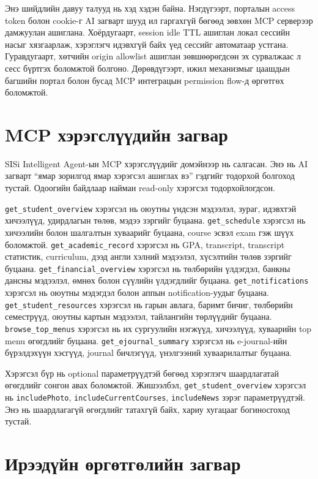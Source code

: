 Энэ шийдлийн давуу талууд нь хэд хэдэн байна. Нэгдүгээрт, порталын access token болон cookie-г AI загварт шууд ил гаргахгүй бөгөөд зөвхөн MCP серверээр дамжуулан ашиглана. Хоёрдугаарт, session idle TTL ашиглан локал сессийн насыг хязгаарлаж, хэрэглэгч идэвхгүй байх үед сессийг автоматаар устгана. Гуравдугаарт, хөтчийн origin allowlist ашиглан зөвшөөрөгдсөн эх сурвалжаас л сесс бүртгэх боломжтой болгоно. Дөрөвдүгээрт, ижил механизмыг цаашдын багшийн портал болон бусад MCP интеграцын permission flow-д өргөтгөх боломжтой.

\section{MCP хэрэгслүүдийн загвар}

SISi Intelligent Agent-ын MCP хэрэгслүүдийг домэйнээр нь салгасан. Энэ нь AI загварт ``ямар зорилгод ямар хэрэгсэл ашиглах вэ'' гэдгийг тодорхой болгоход тустай. Одоогийн байдлаар найман read-only хэрэгсэл тодорхойлогдсон.

\texttt{get\_student\_overview} хэрэгсэл нь оюутны үндсэн мэдээлэл, зураг, идэвхтэй хичээлүүд, удирдлагын төлөв, мэдээ зэргийг буцаана. \texttt{get\_schedule} хэрэгсэл нь хичээлийн болон шалгалтын хуваарийг буцаана, course эсвэл exam гэж шүүх боломжтой. \texttt{get\_academic\_record} хэрэгсэл нь GPA, transcript, transcript статистик, curriculum, дээд англи хэлний мэдээлэл, хүсэлтийн төлөв зэргийг буцаана. \texttt{get\_financial\_overview} хэрэгсэл нь төлбөрийн үлдэгдэл, банкны дансны мэдээлэл, өмнөх болон сүүлийн үлдэгдлийг буцаана. \texttt{get\_notifications} хэрэгсэл нь оюутны мэдэгдэл болон аппын notification-уудыг буцаана. \texttt{get\_student\_resources} хэрэгсэл нь гарын авлага, баримт бичиг, төлбөрийн семестрүүд, оюутны картын мэдээлэл, тайлангийн төрлүүдийг буцаана. \texttt{browse\_top\_menus} хэрэгсэл нь их сургуулийн нэгжүүд, хичээлүүд, хуваарийн top menu өгөгдлийг буцаана. \texttt{get\_ejournal\_summary} хэрэгсэл нь e-journal-ийн бүрэлдэхүүн хэсгүүд, journal бичлэгүүд, үнэлгээний хуваарилалтыг буцаана.

Хэрэгсэл бүр нь optional параметрүүдтэй бөгөөд хэрэглэгч шаардлагатай өгөгдлийг сонгон авах боломжтой. Жишээлбэл, \texttt{get\_student\_overview} хэрэгсэл нь \texttt{includePhoto}, \texttt{includeCurrentCourses}, \texttt{includeNews} зэрэг параметрүүдтэй. Энэ нь шаардлагагүй өгөгдлийг татахгүй байх, хариу хугацааг богиносгоход тустай.

\section{Ирээдүйн өргөтгөлийн загвар}

